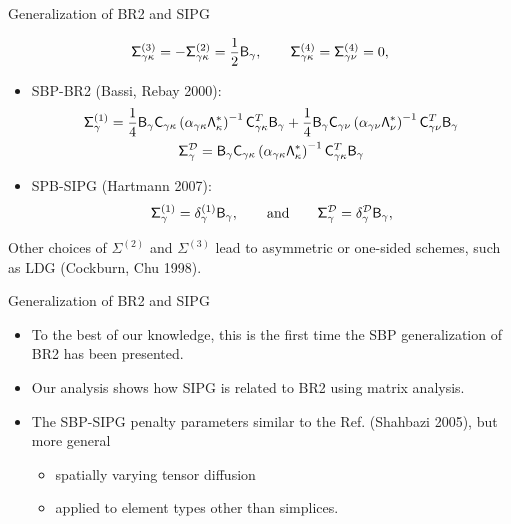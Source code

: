 \documentclass{beamer}
\begin{document}
\begin{frame}{Generalization of BR2 and SIPG}
    
    \vskip 3mm
    \footnotesize
    \begin{equation*}
    \mathsf{\Sigma}_{\gamma\kappa}^{(3)} = -\mathsf{\Sigma}_{\gamma\kappa}^{(2)} = \frac{1}{2}\mathsf{B}_{\gamma}, \qquad
    \mathsf{\Sigma}_{\gamma\kappa}^{(4)} = \mathsf{\Sigma}_{\gamma\nu} ^{(4)} = 0,
    \end{equation*}
    \begin{itemize}
        \normalsize
        \item SBP-BR2 (Bassi, Rebay 2000):
         \footnotesize
        \begin{gather*}
        \mathsf{\Sigma}_{\gamma}^{(1)} = \frac{1}{4}\mathsf{B}_{\gamma} \mathsf{C}_{\gamma\kappa}
        \left(\alpha_{\gamma\kappa}\mathsf{\Lambda}_{\kappa}^{*}\right)^{-1}\mathsf{C}_{\gamma\kappa}^T \mathsf{B}_{\gamma}
        + \frac{1}{4}\mathsf{B}_{\gamma} \mathsf{C}_{\gamma\nu} \left(\alpha_{\gamma\nu} \mathsf{\Lambda}_{\nu}^{*}\right)^{-1}\mathsf{C}_{\gamma\nu}^T \mathsf{B}_{\gamma} \\
        \mathsf{\Sigma}_{\gamma}^{\mathcal{D}} = \mathsf{B}_{\gamma} \mathsf{C}_{\gamma\kappa}
        \left(\alpha_{\gamma\kappa}\mathsf{\Lambda}_{\kappa}^{*}\right)^{-1}\mathsf{C}_{\gamma\kappa}^T \mathsf{B}_{\gamma}
        \end{gather*}
        \normalsize
        \item SPB-SIPG (Hartmann 2007):
        \footnotesize
        \begin{equation*} 
        \mathsf{\Sigma}_{\gamma}^{(1)} = \delta_{\gamma}^{(1)} \mathsf{B}_{\gamma},
        \qquad\text{and}\qquad
        \mathsf{\Sigma}_{\gamma}^{\mathcal{D}} = \delta_{\gamma}^{\mathcal{D}} \mathsf{B}_{\gamma},
        \end{equation*}   
    \end{itemize}
    \normalsize
    \begin{block}{}
        Other choices of $\Sigma^{(2)}$ and $\Sigma^{(3)}$ lead to asymmetric or one-sided schemes, such as LDG (Cockburn, Chu 1998).
    \end{block}
\end{frame}

\begin{frame}{Generalization of BR2 and SIPG}
    
    \begin{itemize}
        \item To the best of our knowledge, this is the first time the SBP generalization of BR2 has been presented.
        \item Our analysis shows how SIPG is related to BR2 using matrix analysis.
        \item The SBP-SIPG penalty parameters similar to the Ref. (Shahbazi 2005), but more general
        \begin{itemize}
            \item spatially varying tensor diffusion
            \item applied to element types other than simplices.
        \end{itemize}
    \end{itemize}
    
\end{frame}
\end{document}
